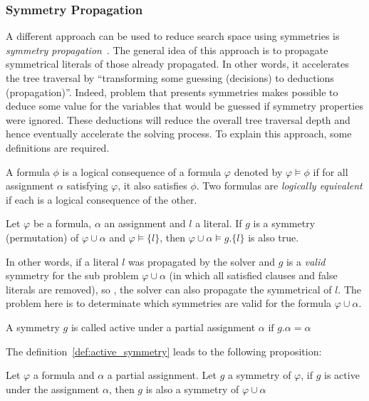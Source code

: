 \subsubsection{Symmetry Propagation}
A different approach can be used to reduce search space using symmetries is \emph{symmetry propagation}~\cite{Devriendt12}.
The general idea of this approach is to propagate symmetrical literals of those already propagated.
In other words, it accelerates the tree traversal by ``transforming some guessing (decisions) to deductions (propagation)''.
Indeed, problem that presents symmetries makes possible to deduce some value 
for the variables that would be guessed if symmetry properties were ignored.
These deductions will reduce the overall tree traversal depth and hence eventually accelerate the solving process.
To explain this approach, some definitions are required.
\begin{definition}
 \label{def:logical_consequence}
 A formula $\phi$ is a logical consequence of a formula $\varphi$ denoted by $\varphi \models \phi$ if for all assignment
 $\alpha$ satisfying $\varphi$, it also satisfies $\phi$. Two formulas are \emph{logically equivalent} if each is a logical
 consequence of the other.
\end{definition}
\begin{proposition}
 \label{prop:symmetry_propagation}
 Let $\varphi$ be a formula, $\alpha$ an assignment and $l$ a literal. 
 If $g$ is a symmetry (permutation) of $\varphi \cup \alpha$ and
 $\varphi \models \{l\}$, then $\varphi \cup \alpha \models g.\{l\}$ is also true.
\end{proposition}
In other words, if a literal $l$ was propagated by the solver and $g$ is a \emph{valid} symmetry for the
sub problem $\varphi \cup \alpha$ (in which all satisfied clauses and false literals are removed), so , the solver can
also propagate the symmetrical of $l$. The problem here is to determinate which symmetries are valid for the formula
$\varphi \cup \alpha$.
\begin{definition}
 \label{def:active_symmetry}
 A symmetry $g$ is called active under a partial assignment $\alpha$ $\text{if } g.\alpha = \alpha$
\end{definition}
The definition~\ref{def:active_symmetry} leads to the following proposition:
\begin{proposition}
 \label{prop:active_symmetry}
 Let $\varphi$ a formula and $\alpha$ a partial assignment. Let $g$ a symmetry of $\varphi$,
 if $g$ is active under the assignment $\alpha$, then $g$ is also a symmetry of $\varphi \cup \alpha$
\end{proposition}
